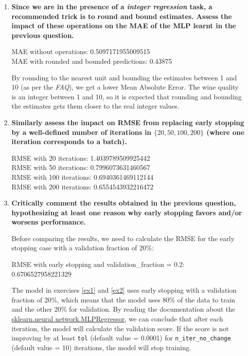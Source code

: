 \documentclass[12pt]{article}
\begin{document}
\begin{enumerate}[leftmargin=\labelsep]
  \item \textbf{Since we are in the presence of a \textit{integer regression} task, a recommended trick is to
          round and bound estimates. Assess the impact of these operations on the MAE of the MLP learnt in the previous question.}\label{ex2}

        \vskip 0.3cm
        

        MAE without operations: 0.5097171955009515 \\
        MAE with rounded and bounded predictions: 0.43875

        \vskip 0.2cm
        By rounding to the nearest unit and bounding the estimates between 1 and 10 (as per the \textit{FAQ}), we get a lower Mean Absolute Error.
        The wine quality is an integer between 1 and 10, so it is expected that rounding and bounding the estimates gets them closer to the real integer values.

  \item \textbf{Similarly assess the impact on RMSE from replacing early stopping by a well-defined
          number of iterations in $\{20,50,100,200\}$ (where one iteration corresponds to a batch).}

        \vskip 0.3cm
        

        RMSE with 20 iterations: 1.4039789509925442  \\
        RMSE with 50 iterations: 0.7996073631460567  \\
        RMSE with 100 iterations: 0.6940361469112144 \\
        RMSE with 200 iterations: 0.6554543932216472

  \item \textbf{Critically comment the results obtained in the previous question, hypothesizing at least
          one reason why early stopping favors and/or worsens performance.}

        \vskip 0.3cm
        Before comparing the results, we need to calculate the RMSE for the early stopping case with a validation fraction of 20\%:

        

        RMSE with early stopping and validation\_fraction = 0.2: 0.6706527958221329

        \vskip 0.2cm
        The model in exercises \ref{ex1} and \ref{ex2} uses early stopping with a validation fraction of 20\%, which means that the model uses 80\% of the data to train and
        the other 20\% for validation. By reading the documentation about the \href{https://scikit-learn.org/stable/modules/generated/sklearn.neural_network.MLPRegressor.html}{sklearn.neural network.MLPRegressor},
        we can conclude that after each iteration, the model will calculate the validation score. If the score is not improving by at least
        \texttt{tol} (default value = 0.0001) for \texttt{n\_iter\_no\_change} (default value = 10) iterations, the model will stop training.


\end{enumerate}
\end{document}
